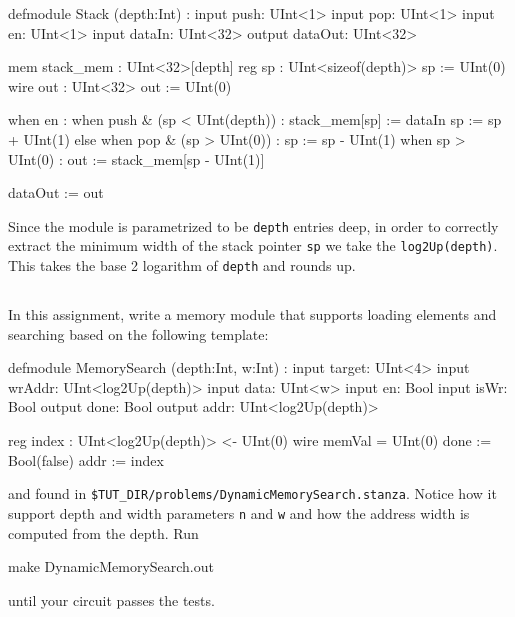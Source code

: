 \begin{stanza}
defmodule Stack (depth:Int) :
  input push: UInt<1>
  input pop: UInt<1>
  input en: UInt<1>
  input dataIn: UInt<32>
  output dataOut: UInt<32>

  mem stack_mem : UInt<32>[depth]
  reg sp : UInt<sizeof(depth)> sp := UInt(0)
  wire out : UInt<32> out := UInt(0)

  when en :
    when push & (sp < UInt(depth)) :
      stack_mem[sp] := dataIn
      sp := sp + UInt(1)
    else when pop & (sp > UInt(0)) :
      sp := sp - UInt(1)
    when sp > UInt(0) :
      out := stack_mem[sp - UInt(1)]

  dataOut := out
\end{stanza}

Since the module is parametrized to be \verb+depth+ entries deep, in order to correctly extract the minimum width of the stack pointer \verb+sp+ we take the \verb+log2Up(depth)+. This takes the base 2 logarithm of \verb+depth+ and rounds up.

\subsection{}

In this assignment, write a memory module that supports loading elements and searching based on the following template:

\begin{stanza}
defmodule MemorySearch (depth:Int, w:Int) :
  input  target: UInt<4>
  input  wrAddr: UInt<log2Up(depth)>
  input  data:   UInt<w>
  input  en:     Bool
  input  isWr:   Bool
  output done:   Bool
  output addr:   UInt<log2Up(depth)>

  reg index : UInt<log2Up(depth)> <- UInt(0)
  wire memVal = UInt(0)
  done := Bool(false)
  addr := index
\end{stanza}

\noindent
and found in \verb+$TUT_DIR/problems/DynamicMemorySearch.stanza+.
Notice how it support depth and width parameters \verb+n+ and \verb+w+ and 
how the address width is computed from the depth. Run 

\begin{bash}
make DynamicMemorySearch.out
\end{bash}

\noindent 
until your circuit passes the tests.
